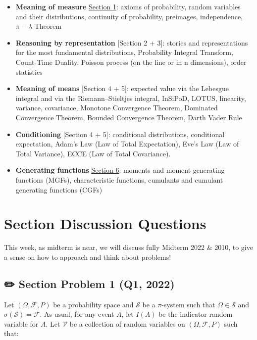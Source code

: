 \documentclass[
  letterpaper,
  DIV=11,
  numbers=noendperiod]{scrreprt}
\theoremstyle{definition}
\theoremstyle{plain}
\theoremstyle{remark}
\begin{document}
\begin{itemize}
\item
  \textbf{Meaning of measure} \protect\hyperlink{section-1}{Section 1}:
  axioms of probability, random variables and their distributions,
  continuity of probability, preimages, independence, \(\pi-\lambda\)
  Theorem
\item
  \textbf{Reasoning by representation} {[}Section 2 + 3{]}: stories and
  representations for the most fundamental distributions, Probability
  Integral Transform, Count-Time Duality, Poisson process (on the line
  or in n dimensions), order statistics
\item
  \textbf{Meaning of means} {[}Section 4 + 5{]}: expected value via the
  Lebesgue integral and via the Riemann--Stieltjes integral, InSiPoD,
  LOTUS, linearity, variance, covariance, Monotone Convergence Theorem,
  Dominated Convergence Theorem, Bounded Convergence Theorem, Darth
  Vader Rule
\item
  \textbf{Conditioning} {[}Section 4 + 5{]}: conditional distributions,
  conditional expectation, Adam's Law (Law of Total Expectation), Eve's
  Law (Law of Total Variance), ECCE (Law of Total Covariance).
\item
  \textbf{Generating functions} \protect\hyperlink{section-6}{Section
  6}: moments and moment generating functions (MGFs), characteristic
  functions, cumulants and cumulant generating functions (CGFs)
\end{itemize}

\hypertarget{section-discussion-questions-4}{%
\section*{Section Discussion
Questions}\label{section-discussion-questions-4}}


This week, as midterm is near, we will discuss fully Midterm 2022 \&
2010, to give a sense on how to approach and think about problems!

\hypertarget{section-problem-1-q1-2022}{%
\subsection*{✏️ Section Problem 1 (Q1,
2022)}\label{section-problem-1-q1-2022}}

Let \((\Omega, \mathcal{F}, P)\) be a probability space and
\(\mathcal{S}\) be a \(\pi\)-system such that \(\Omega \in \mathcal{S}\)
and \(\sigma(\mathcal{S})=\mathcal{F}\). As usual, for any event \(A\),
let \(I(A)\) be the indicator random variable for \(A\). Let
\(\mathcal{V}\) be a collection of random variables on
\((\Omega, \mathcal{F}, P)\) such that:
\end{document}
